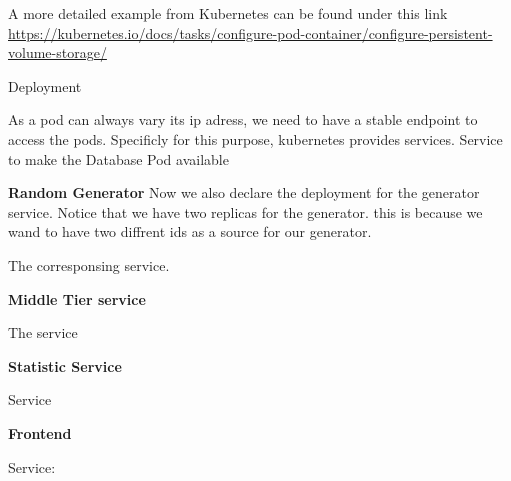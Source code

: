 A more detailed example from Kubernetes can be found under this link \url{https://kubernetes.io/docs/tasks/configure-pod-container/configure-persistent-volume-storage/}

Deployment


As a pod can always vary its ip adress, we need to have a stable endpoint to access the pods.
Specificly for this purpose, kubernetes provides services.
Service to make the Database Pod available 


\textbf{Random Generator}
Now we also declare the deployment for the generator service.
Notice that we have two replicas for the generator. this is because we wand to have two diffrent ids as a source for our generator.


The corresponsing service.


\textbf{Middle Tier service}

The service


\textbf{Statistic Service}

Service


\textbf{Frontend}


Service:

